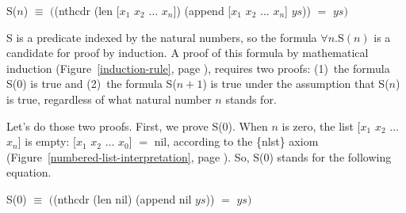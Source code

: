 \begin{samepage}
\begin{center}
\label{append-prefix-thm-predicate}
S($n$) $\equiv$ $($\textsf{(nthcdr (len [$x_1$ $x_2$ $\dots$ $x_n$]) (append [$x_1$ $x_2$ $\dots$ $x_n$] $ys$))} $=$ $ys)$
\end{center}
\end{samepage}



\label{append-suffix-thm-pencil-proof} 
S is a predicate indexed by the natural numbers,
so the formula $\forall n.$S$(n)$ is a candidate for proof by induction.
A proof of this formula by mathematical induction
(Figure~\ref{induction-rule}, page \pageref{induction-rule}),
requires two proofs:
(1)~the formula S(0) is true and
(2)~the formula S($n+1$) is true under the assumption that S($n$) is true,
regardless of what natural number $n$ stands for.

Let's do those two proofs.
First, we prove S(0).
When $n$ is zero, the list \textsf{[$x_1$ $x_2$ $\dots$ $x_n$]} is empty:
\textsf{[$x_1$ $x_2$ $\dots$ $x_0$]} $=$ \textsf{nil}, according to the \{nlst\} axiom
(Figure~\ref{numbered-list-interpretation}, page \pageref{numbered-list-interpretation}).
So, S(0) stands for the following equation.

\begin{samepage}
\begin{center}
S(0) $\equiv$ $($\textsf{(nthcdr (len nil) (append nil $ys$))} $=$ $ys)$
\end{center}
\end{samepage}


